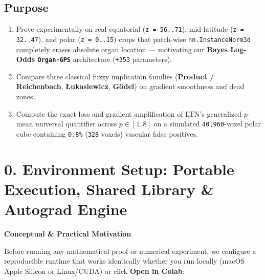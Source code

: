 \documentclass[10pt,a4paper]{article}
\renewcommand{\_}{\origunderscore\allowbreak}
\begin{document}
\subsection*{Purpose}
\begin{enumerate}
\item Prove experimentally on real equatorial (\texttt{z = 56..71}), mid-latitude (\texttt{z = 32..47}), and polar (\texttt{z = 0..15}) crops that patch-wise \texttt{nn.InstanceNorm3d} completely erases absolute organ location --- motivating our \textbf{Bayes Log-Odds \texttt{Organ-GPS}} architecture (\texttt{+353} parameters).
\item Compare three classical fuzzy implication families (\textbf{Product /\allowbreak{} Reichenbach}, \textbf{\L{}ukasiewicz}, \textbf{G\"odel}) on gradient smoothness and dead zones.
\item Compute the exact loss and gradient amplification of LTN's generalized $p$-mean universal quantifier across $p \in [1, 8]$ on a simulated \texttt{40,960}-voxel polar cube containing \texttt{0.8\%} (\texttt{328} voxels) vascular false positives.
\end{enumerate}

\section*{0. Environment Setup: Portable Execution, Shared Library \& Autograd Engine}

\begin{guidehdr}
{\small\bfseries\color{kiwigreen!75!black}Conceptual \& Practical Motivation}
\end{guidehdr}
Before running any mathematical proof or numerical experiment, we configure a reproducible runtime that works identically whether you run locally (macOS Apple Silicon or Linux/\allowbreak{}CUDA) or click \textbf{Open in Colab}:
\end{document}
